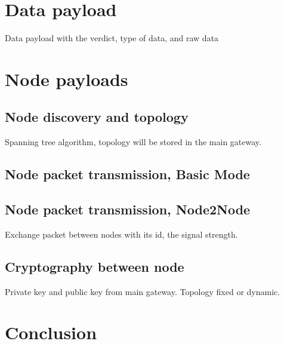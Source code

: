 \documentclass[9pt,conference]{IEEEtran}
\begin{document}
\section{Data payload} \label{sec:data-payload}
Data payload with the verdict, type of data, and raw data

\section{Node payloads} \label{sec:node-payload}
\subsection{Node discovery and topology}
Spanning tree algorithm, topology will be stored in the main gateway.

\subsection{Node packet transmission, Basic Mode}
\subsection{Node packet transmission, Node2Node}
Exchange packet between nodes with its id, the signal strength.

\subsection{Cryptography between node} \label{subsec:node-crypto} 
Private key and public key from main gateway. Topology fixed or dynamic.

\section{Conclusion}

\nocite{*}


\end{document}
